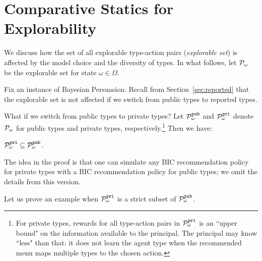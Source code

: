 
\section{Comparative Statics for Explorability}
\label{sec:statics}

\newcommand{\pairs}{\mP_\omega}
\newcommand{\pairsPub}{\pairs^{\term{pub}}}
\newcommand{\pairsPri}{\pairs^{\term{pri}}}
\newcommand{\support}{\term{support}}

We discuss how the set of all explorable type-action pairs (\emph{explorable set}) is affected by the model choice and the diversity of types. In what follows, let $\pairs$ be the explorable set for state $\omega\in\varOmega$.

Fix an instance of Bayesian Persuasion. Recall from Section~\ref{sec:reported} that the explorable set is not affected if we switch from public types to reported types. 

What if we switch from public types to private types? Let $\pairsPub$ and $\pairsPri$ denote $\pairs$ for public types and private types, respectively.\footnote{For private types, rewards for all type-action pairs in $\pairsPri$ is an ``upper bound" on the information available to the principal. The principal may know ``less" than that: it does not learn the agent type when the recommended menu maps multiple types to the chosen action.}
Then we have: 
 
\begin{claim}
$\pairsPri \subseteq \pairsPub$.
\end{claim}

The idea in the proof is that one can simulate any BIC recommendation policy for private types with a BIC recommendation policy for public types; we omit the details from this version.%

Let us prove an example when $\pairsPri$ is a strict subset of $\pairsPub$.

